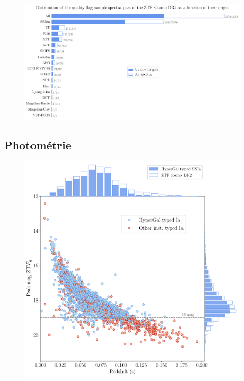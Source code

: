 \documentclass[../main/main.tex]{subfiles}
\begin{document}
\begin{figure}[ht]
  \centering
  \includegraphics[width=1\textwidth]{../figures/09_dr2/spec_instorigin_golden_dr2.pdf}
  \caption[]{}
  \label{fig:specorigingoldendr2}
\end{figure}

\subsection{Photométrie}


\begin{figure}[ht]
  \centering
  \includegraphics[width=1\textwidth]{../figures/09_dr2/peakvsredshift_dr2.pdf}
  \caption[]{}
  \label{fig:peakmagztfg}
\end{figure}
\end{document}

